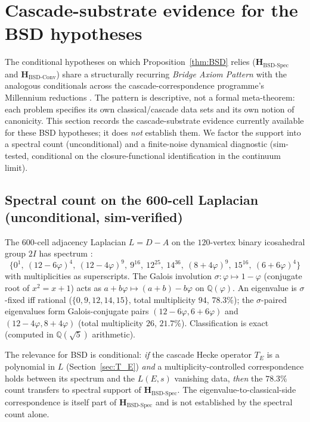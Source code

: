 \documentclass[11pt, a4paper]{amsart}
\theoremstyle{definition}
\newcommand{\Q}{\mathbb{Q}}
\begin{document}
\section{Cascade-substrate evidence for the BSD hypotheses}\label{sec:attractor_support}

The conditional hypotheses on which Proposition~\ref{thm:BSD} relies
($\mathbf{H_{\mathrm{BSD\text{-}Spec}}}$ and
$\mathbf{H_{\mathrm{BSD\text{-}Conv}}}$) share a structurally
recurring \emph{Bridge Axiom Pattern} with the analogous
conditionals across the cascade-correspondence programme's
Millennium reductions \cite{ConvergenceWithSmart, CascadeRHformal}.
The pattern is descriptive, not a formal meta-theorem: each problem
specifies its own classical/cascade data sets and its own notion
of canonicity.  This section records the cascade-substrate
evidence currently available for these BSD hypotheses; it does
\emph{not} establish them.  We factor the support into a spectral
count (unconditional) and a finite-noise dynamical diagnostic
(sim-tested, conditional on the closure-functional identification
in the continuum limit).

\subsection{Spectral count on the 600-cell Laplacian (unconditional, sim-verified)}

The 600-cell adjacency Laplacian $L = D - A$ on the
$120$-vertex binary icosahedral group $2I$ has spectrum
\cite{CascadeAttractorSpectrum}:
\[
  \{0^{1},\ (12{-}6\varphi)^{4},\ (12{-}4\varphi)^{9},\ 9^{16},\
   12^{25},\ 14^{36},\ (8{+}4\varphi)^{9},\ 15^{16},\
   (6{+}6\varphi)^{4}\}
\]
with multiplicities as superscripts.  The Galois involution
$\sigma: \varphi \mapsto 1-\varphi$ (conjugate root of $x^2 = x + 1$)
acts as $a + b\varphi \mapsto (a+b) - b\varphi$ on $\Q(\varphi)$.
An eigenvalue is $\sigma$-fixed iff rational ($\{0,9,12,14,15\}$,
total multiplicity $94$, $\bm{78.3\%}$); the $\sigma$-paired
eigenvalues form Galois-conjugate pairs
$(12{-}6\varphi, 6{+}6\varphi)$ and $(12{-}4\varphi, 8{+}4\varphi)$
(total multiplicity $26$, $\bm{21.7\%}$).  Classification is
exact (computed in $\Q(\sqrt 5)$ arithmetic).

The relevance for BSD is conditional: \emph{if} the cascade Hecke
operator $T_E$ is a polynomial in $L$ (Section~\ref{sec:T_E})
\emph{and} a multiplicity-controlled correspondence holds between
its spectrum and the $L(E,s)$ vanishing data, \emph{then} the
$78.3\%$ count transfers to spectral support of $\mathbf{H_{\mathrm{BSD\text{-}Spec}}}$.
The eigenvalue-to-classical-side correspondence is itself part of
$\mathbf{H_{\mathrm{BSD\text{-}Spec}}}$ and is not established by
the spectral count alone.
\end{document}
